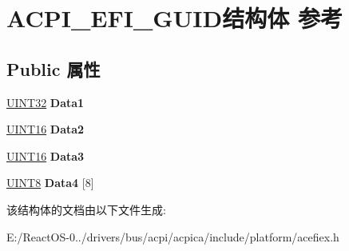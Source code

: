 \hypertarget{struct_a_c_p_i___e_f_i___g_u_i_d}{}\section{A\+C\+P\+I\+\_\+\+E\+F\+I\+\_\+\+G\+U\+I\+D结构体 参考}
\label{struct_a_c_p_i___e_f_i___g_u_i_d}
\subsection*{Public 属性}
\begin{DoxyCompactItemize}
\item 
\mbox{\label{struct_a_c_p_i___e_f_i___g_u_i_d_a0e16a56a7953bf2350e423ff41199b81}} 
\hyperlink{_processor_bind_8h_ae1e6edbbc26d6fbc71a90190d0266018}{U\+I\+N\+T32} {\bfseries Data1}
\item 
\mbox{\label{struct_a_c_p_i___e_f_i___g_u_i_d_a333aa2f4c3035a65795d34598bf22e4a}} 
\hyperlink{_processor_bind_8h_a09f1a1fb2293e33483cc8d44aefb1eb1}{U\+I\+N\+T16} {\bfseries Data2}
\item 
\mbox{\label{struct_a_c_p_i___e_f_i___g_u_i_d_a46c719d2e89484b6d677d84b1e0b894e}} 
\hyperlink{_processor_bind_8h_a09f1a1fb2293e33483cc8d44aefb1eb1}{U\+I\+N\+T16} {\bfseries Data3}
\item 
\mbox{\label{struct_a_c_p_i___e_f_i___g_u_i_d_ac45c89cba387bbce522d1c5d96cee092}} 
\hyperlink{_processor_bind_8h_ab27e9918b538ce9d8ca692479b375b6a}{U\+I\+N\+T8} {\bfseries Data4} \mbox{[}8\mbox{]}
\end{DoxyCompactItemize}


该结构体的文档由以下文件生成\+:\begin{DoxyCompactItemize}
\item 
E\+:/\+React\+O\+S-\/0../drivers/bus/acpi/acpica/include/platform/acefiex.\+h\end{DoxyCompactItemize}
